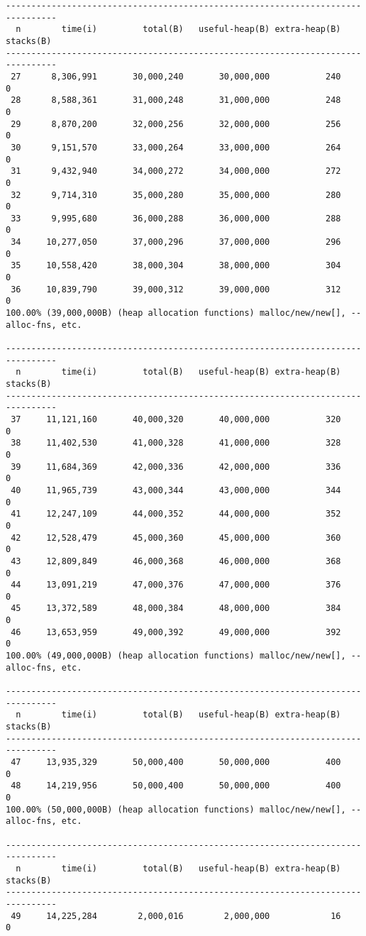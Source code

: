 \begin{lstlisting}
--------------------------------------------------------------------------------
  n        time(i)         total(B)   useful-heap(B) extra-heap(B)    stacks(B)
--------------------------------------------------------------------------------
 27      8,306,991       30,000,240       30,000,000           240            0
 28      8,588,361       31,000,248       31,000,000           248            0
 29      8,870,200       32,000,256       32,000,000           256            0
 30      9,151,570       33,000,264       33,000,000           264            0
 31      9,432,940       34,000,272       34,000,000           272            0
 32      9,714,310       35,000,280       35,000,000           280            0
 33      9,995,680       36,000,288       36,000,000           288            0
 34     10,277,050       37,000,296       37,000,000           296            0
 35     10,558,420       38,000,304       38,000,000           304            0
 36     10,839,790       39,000,312       39,000,000           312            0
100.00% (39,000,000B) (heap allocation functions) malloc/new/new[], --alloc-fns, etc.

--------------------------------------------------------------------------------
  n        time(i)         total(B)   useful-heap(B) extra-heap(B)    stacks(B)
--------------------------------------------------------------------------------
 37     11,121,160       40,000,320       40,000,000           320            0
 38     11,402,530       41,000,328       41,000,000           328            0
 39     11,684,369       42,000,336       42,000,000           336            0
 40     11,965,739       43,000,344       43,000,000           344            0
 41     12,247,109       44,000,352       44,000,000           352            0
 42     12,528,479       45,000,360       45,000,000           360            0
 43     12,809,849       46,000,368       46,000,000           368            0
 44     13,091,219       47,000,376       47,000,000           376            0
 45     13,372,589       48,000,384       48,000,000           384            0
 46     13,653,959       49,000,392       49,000,000           392            0
100.00% (49,000,000B) (heap allocation functions) malloc/new/new[], --alloc-fns, etc.

--------------------------------------------------------------------------------
  n        time(i)         total(B)   useful-heap(B) extra-heap(B)    stacks(B)
--------------------------------------------------------------------------------
 47     13,935,329       50,000,400       50,000,000           400            0
 48     14,219,956       50,000,400       50,000,000           400            0
100.00% (50,000,000B) (heap allocation functions) malloc/new/new[], --alloc-fns, etc.

--------------------------------------------------------------------------------
  n        time(i)         total(B)   useful-heap(B) extra-heap(B)    stacks(B)
--------------------------------------------------------------------------------
 49     14,225,284        2,000,016        2,000,000            16            0
\end{lstlisting}
